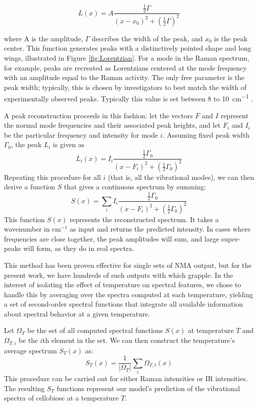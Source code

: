 \begin{equation}
L(x) = A\frac{\frac{1}{2}\Gamma}{(x-x_0)^2 + (\frac{1}{2}\Gamma)^2}
\end{equation}

\noindent where A is the amplitude, $\Gamma$ describes the width of the peak, and $x_0$ is the peak center. This function generates peaks with a distinctively pointed shape and long wings, illustrated in Figure \ref{fig:Lorentzian}. For a mode in the Raman spectrum, for example, peaks are recreated as Lorentzians centered at the mode frequency with an amplitude equal to the Raman activity. The only free parameter is the peak width; typically, this is chosen by investigators to best match the width of experimentally observed peaks. Typically this value is set between 8 to \SI{10}{cm^{-1}} \cite{RefWorks:33}.

A peak reconstruction proceeds in this fashion: let the vectors $F$ and $I$ represent the normal mode frequencies and their associated peak heights, and let $F_i$ and $I_i$ be the particular frequency and intensity for mode $i$. Assuming fixed peak width $\Gamma_0$, the peak $L_i$ is given as
\begin{equation}
L_i(x) = I_i\frac{\frac{1}{2}\Gamma_0}{(x-F_i)^2 + (\frac{1}{2}\Gamma_0)^2}
\end{equation}
Repeating this procedure for all $i$ (that is, all the vibrational modes), we can then derive a function $S$ that gives a continuous spectrum by summing:
\begin{equation}
S(x) = \sum_i I_i\frac{\frac{1}{2}\Gamma_0}{(x-F_i)^2 + (\frac{1}{2}\Gamma_0)^2}
\end{equation}
This function $S(x)$ represents the reconstructed spectrum. It takes a wavenumber in cm$^{-1}$ as input and returns the predicted intensity. In cases where frequencies are close together, the peak amplitudes will sum, and large super-peaks will form, as they do in real spectra.

This method has been proven effective for single sets of NMA output, but for the present work, we have hundreds of such outputs with which grapple. In the interest of isolating the effect of temperature on spectral features, we chose to handle this by averaging over the spectra computed at each temperature, yielding a set of second-order spectral functions that integrate all available information about spectral behavior at a given temperature.

Let $\Omega_T$ be the set of all computed spectral functions $S(x)$ at temperature $T$ and $\Omega_{T,i}$ be the $i$th element in the set. We can then construct the temperature's average spectrum $S_T(x)$ as:
\begin{equation}
S_T(x) = \frac{1}{|\Omega_T|}\sum_i \Omega_{T,t}(x)
\end{equation}
This procedure can be carried out for either Raman intensities or IR intensities. The resulting $S_T$ functions represent our model's prediction of the vibrational spectra of cellobiose at a temperature $T$.

